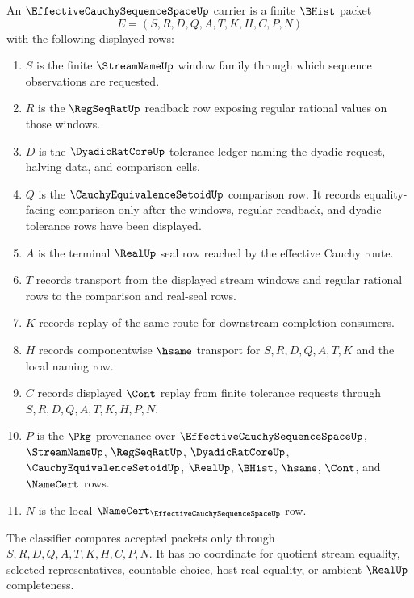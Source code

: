 \begin{definition}
\label{def:effective-cauchy-sequence-space-carrier}
An $\EffectiveCauchySequenceSpaceUp$ carrier is a finite $\BHist$ packet
$$
E=(S,R,D,Q,A,T,K,H,C,P,N)
$$
with the following displayed rows:
\begin{enumerate}
\item $S$ is the finite $\StreamNameUp$ window family through which sequence observations are requested.
\item $R$ is the $\RegSeqRatUp$ readback row exposing regular rational values on those windows.
\item $D$ is the $\DyadicRatCoreUp$ tolerance ledger naming the dyadic request, halving data, and comparison cells.
\item $Q$ is the $\CauchyEquivalenceSetoidUp$ comparison row. It records equality-facing comparison only after the windows, regular readback, and dyadic tolerance rows have been displayed.
\item $A$ is the terminal $\RealUp$ seal row reached by the effective Cauchy route.
\item $T$ records transport from the displayed stream windows and regular rational rows to the comparison and real-seal rows.
\item $K$ records replay of the same route for downstream completion consumers.
\item $H$ records componentwise $\hsame$ transport for $S,R,D,Q,A,T,K$ and the local naming row.
\item $C$ records displayed $\Cont$ replay from finite tolerance requests through $S,R,D,Q,A,T,K,H,P,N$.
\item $P$ is the $\Pkg$ provenance over $\EffectiveCauchySequenceSpaceUp$, $\StreamNameUp$, $\RegSeqRatUp$, $\DyadicRatCoreUp$, $\CauchyEquivalenceSetoidUp$, $\RealUp$, $\BHist$, $\hsame$, $\Cont$, and $\NameCert$ rows.
\item $N$ is the local $\NameCert_{\EffectiveCauchySequenceSpaceUp}$ row.
\end{enumerate}
The classifier compares accepted packets only through $S,R,D,Q,A,T,K,H,C,P,N$. It has no coordinate for quotient stream equality, selected representatives, countable choice, host real equality, or ambient $\RealUp$ completeness.
\end{definition}

